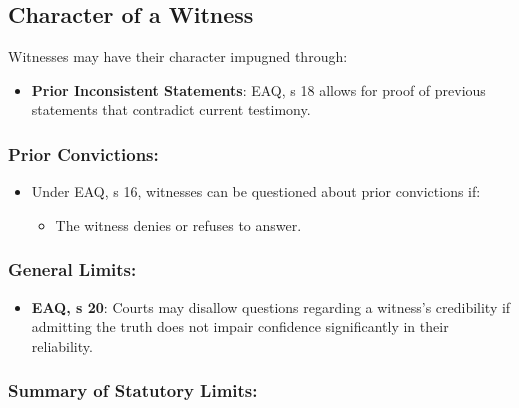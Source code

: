 \subsection{Character of a Witness}\label{character-of-a-witness}

Witnesses may have their character impugned through:

\begin{itemize}
\tightlist
\item
  \textbf{Prior Inconsistent Statements}: EAQ, s 18 allows for proof of
  previous statements that contradict current testimony.
\end{itemize}

\subsubsection{Prior Convictions:}\label{prior-convictions}

\begin{itemize}
\tightlist
\item
  Under EAQ, s 16, witnesses can be questioned about prior convictions
  if:

  \begin{itemize}
  \tightlist
  \item
    The witness denies or refuses to answer.
  \end{itemize}
\end{itemize}

\subsubsection{General Limits:}\label{general-limits}

\begin{itemize}
\tightlist
\item
  \textbf{EAQ, s 20}: Courts may disallow questions regarding a
  witness's credibility if admitting the truth does not impair
  confidence significantly in their reliability.
\end{itemize}

\subsubsection{Summary of Statutory
Limits:}\label{summary-of-statutory-limits}


